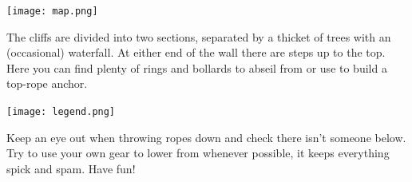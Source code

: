 \documentclass[10pt,a4paper,landscape]{article}
\begin{document}
\begin{multicols}{2}
\begin{center}
  \texttt{[image: map.png]}
\end{center}

The cliffs are divided into two sections, separated by a thicket of trees with an (occasional) waterfall.
At either end of the wall there are steps up to the top.
Here you can find plenty of rings and bollards to abseil from or use to build a top-rope anchor.

\begin{center}
  \texttt{[image: legend.png]}
\end{center}

Keep an eye out when throwing ropes down and check there isn't someone below.
Try to use your own gear to lower from whenever possible, it keeps everything spick and spam.
Have fun!



\end{multicols}
\end{document}
